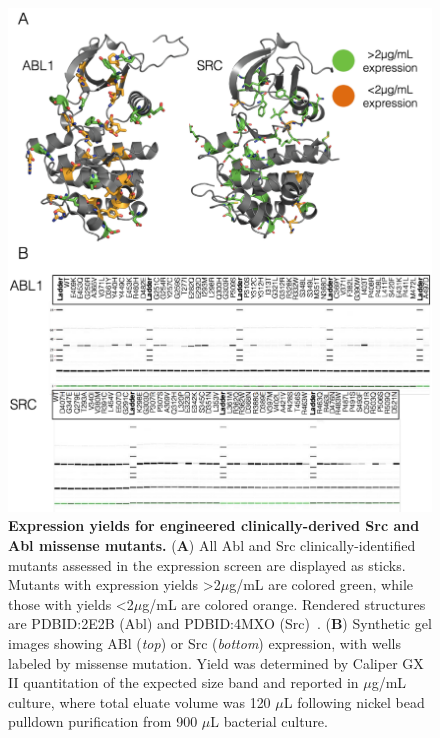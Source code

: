 \documentclass[9pt,lineno]{elife}
\begin{document}
\begin{figure}[h!]
\centering
\begin{fullwidth}
   \includegraphics[width=0.9\linewidth]{96-mutant-finalfigure.pdf}
   
  \caption{{\bf Expression yields for engineered clinically-derived Src and Abl missense mutants.}
  ({\bf A}) All Abl and Src clinically-identified mutants assessed in the expression screen are displayed as sticks. 
  Mutants with expression yields >2$\mu$g/mL are colored green, while those with yields <2$\mu$g/mL are colored orange. 
  Rendered structures are PDBID:2E2B (Abl) and PDBID:4MXO (Src)~\citep{Levinson:2014gi}.
  ({\bf B}) Synthetic gel images showing ABl (\emph{top}) or Src (\emph{bottom}) expression, with wells labeled by missense mutation.  Yield  was determined by Caliper GX II quantitation of the expected size band and reported in $\mu$g/mL culture, where total eluate volume was 120 $\mu$L following nickel bead pulldown purification from 900 $\mu$L bacterial culture.
   }
  \label{fig:96-mutant-fig}
\end{fullwidth}
\end{figure}
\end{document}
